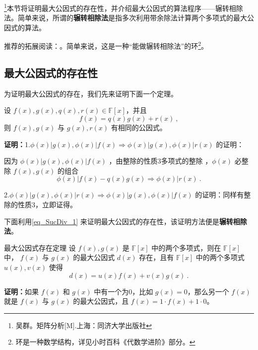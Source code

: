 
\begin{issues}
\end{issues}
\footnote{吴群。矩阵分析[M].上海：同济大学出版社}本节将证明最大公因式的存在性，并介绍最大公因式的算法程序——辗转相除法。简单来说，所谓的\textbf{辗转相除法}是指多次利用带余除法计算两个多项式的最大公因式的算法。


推荐的拓展阅读：。简单来说，这是一种“能做辗转相除法”的环\footnote{环是一种数学结构，详见小时百科《代数学进阶》部分。}。


\subsection{最大公因式的存在性}
为证明最大公因式的存在，我们先来证明下面一个定理。
\begin{theorem}{}\label{the_SucDiv_1}
设 $f(x),g(x),q(x),r(x)\in\mathbb{F}[x]$，并且
\begin{equation}\label{eq_SucDiv_1}
f(x)=q(x)g(x)+r(x)~,
\end{equation}
则 $f(x),g(x)$ 与 $g(x),r(x)$ 有相同的公因式。
\end{theorem}
\textbf{证明：}1.$\phi(x)|g(x),\phi(x)|f(x)\Rightarrow \phi(x)|g(x),\phi(x)|r(x)$ 的证明：

因为 $\phi(x)|g(x),\phi(x)|f(x)$ ，由整除的性质3多项式的整除 ，$\phi(x)$ 必整除 $f(x),g(x)$ 的组合
\begin{equation}
\phi(x)|f(x)-q(x)g(x)\Rightarrow \phi(x)|r(x)~.
\end{equation}

2.$\phi(x)|g(x),\phi(x)|r(x)\Rightarrow\phi(x)|g(x),\phi(x)|f(x)$ 的证明：同样有整除的性质3，立即证得。

下面利用\autoref{eq_SucDiv_1} 来证明最大公因式的存在性，该证明方法便是\textbf{辗转相除法}。
\begin{theorem}{最大公因式存在定理}\label{the_SucDiv_2}
设 $f(x),g(x)$ 是 $\mathbb{F}[x]$ 中的两个多项式，则在 $\mathbb{F}[x]$ 中， $f(x)$ 与 $g(x)$ 的最大公因式 $d(x)$ 存在，且有 $\mathbb{F}[x]$ 中的两个多项式 $u(x),v(x)$ 使得
\begin{equation}\label{eq_SucDiv_2}
d(x)=u(x)f(x)+v(x)g(x)~.
\end{equation}

\end{theorem}
\textbf{证明：}如果 $f(x)$ 和 $g(x)$ 中有一个为0，比如 $g(x)=0$，那么另一个 $f(x)$ 就是 $f(x)$ 与 $g(x)$ 的最大公因式，且 $f(x)=1\cdot f(x)+1\cdot0$。

